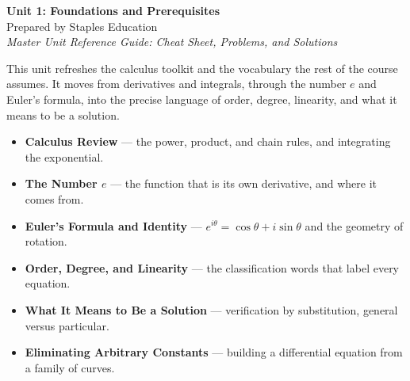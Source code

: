 




\begin{center}
    {\LARGE \bfseries Unit 1: Foundations and Prerequisites}\\[6pt]
    {\large Prepared by Staples Education}\\[4pt]
    {\itshape Master Unit Reference Guide: Cheat Sheet, Problems, and Solutions}
\end{center}

\vspace{0.4em}

\tableofcontents

\vspace{0.4em}

\begin{topicsbox}
This unit refreshes the calculus toolkit and the vocabulary the rest of the
course assumes. It moves from derivatives and integrals, through the number $e$
and Euler's formula, into the precise language of order, degree, linearity, and
what it means to be a solution.
\begin{itemize}[leftmargin=1.4em, itemsep=3pt]
    \item \textbf{Calculus Review} --- the power, product, and chain rules, and
          integrating the exponential.
    \item \textbf{The Number $e$} --- the function that is its own derivative,
          and where it comes from.
    \item \textbf{Euler's Formula and Identity} --- $e^{i\theta} = \cos\theta +
          i\sin\theta$ and the geometry of rotation.
    \item \textbf{Order, Degree, and Linearity} --- the classification words
          that label every equation.
    \item \textbf{What It Means to Be a Solution} --- verification by
          substitution, general versus particular.
    \item \textbf{Eliminating Arbitrary Constants} --- building a differential
          equation from a family of curves.
\end{itemize}
\end{topicsbox}

